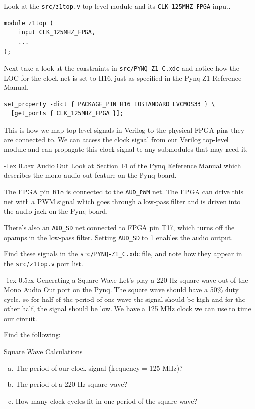 \documentclass[11pt]{article}
\makeatletter
\renewcommand{\subsection}
{\@startsection {subsection}{1}{0pt}
 {-1ex}
 {0.5ex}
 {\bfseries\normalsize}}
\makeatother
\begin{document}
Look at the \texttt{src/z1top.v} top-level module and its \verb|CLK_125MHZ_FPGA| input.
\begin{verbatim}
module z1top (
    input CLK_125MHZ_FPGA,
    ...
);
\end{verbatim}
Next take a look at the constraints in \texttt{src/PYNQ-Z1\_C.xdc} and notice how the LOC for the clock net is set to H16, just as specified in the Pynq-Z1 Reference Manual.
\begin{verbatim}
set_property -dict { PACKAGE_PIN H16 IOSTANDARD LVCMOS33 } \
  [get_ports { CLK_125MHZ_FPGA }];
\end{verbatim}
This is how we map top-level signals in Verilog to the physical FPGA pins they are connected to.
We can access the clock signal from our Verilog top-level module and can propagate this clock signal to any submodules that may need it.

\subsection{Audio Out}
Look at Section 14 of the \href{https://reference.digilentinc.com/reference/programmable-logic/pynq-z1/reference-manual}{Pynq Reference Manual} which describes the mono audio out feature on the Pynq board.

The FPGA pin R18 is connected to the \verb|AUD_PWM| net.
The FPGA can drive this net with a PWM signal which goes through a low-pass filter and is driven into the audio jack on the Pynq board.

There's also an \verb|AUD_SD| net connected to FPGA pin T17, which turns off the opamps in the low-pass filter.
Setting \verb|AUD_SD| to 1 enables the audio output.

Find these signals in the \texttt{src/PYNQ-Z1\_C.xdc} file, and note how they appear in the \texttt{src/z1top.v} port list.

\subsection{Generating a Square Wave}
Let's play a 220 Hz square wave out of the Mono Audio Out port on the Pynq.
The square wave should have a 50\% duty cycle, so for half of the period of one wave the signal should be high and for the other half, the signal should be low.
We have a 125 MHz clock we can use to time our circuit.

Find the following:
\begin{texexptitled}{Square Wave Calculations}{}
\begin{enumerate}[a)]
\item The period of our clock signal (frequency = 125 MHz)?
\item The period of a 220 Hz square wave?
\item How many clock cycles fit in one period of the square wave?
\end{enumerate}
\end{texexptitled}
\end{document}
